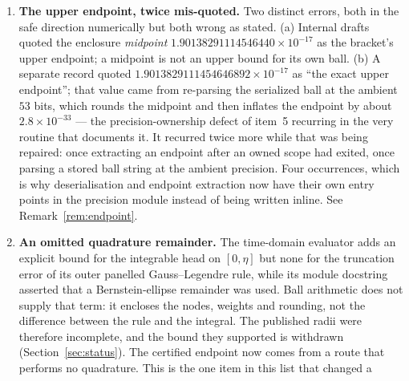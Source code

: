 \documentclass[11pt,a4paper]{article}
\theoremstyle{definition}
\theoremstyle{remark}
\begin{document}
\begin{enumerate}
  changed its caller's context; this produced four separate wrong constants in
  this project, each plausible-looking rather than an error (a complement
  constant at $[\pm 7.4\times10^{132}]$, an even-sector $d$ at $[\pm
  2.8\times10^{183}]$, and two coefficient sets built at $53$ bits). The repair
  is an owned-scope wrapper that asserts restoration on normal return
  \emph{and} on exception, caches keyed by precision so a low-precision value
  can never be served to a high-precision caller, and an explicit
  \emph{unresolved} result for any wide or non-finite enclosure. The lesson, and
  the harder half, is that \emph{an input constructed outside the scope carries
  the ambient precision's radius, and entering a higher-precision scope
  afterwards does not recover it}: own your inputs as well as your scope.
\item \textbf{The upper endpoint, twice mis-quoted.} Two distinct errors, both
  in the safe direction numerically but both wrong as stated. (a) Internal
  drafts quoted the enclosure \emph{midpoint}
  $1.90138291114546440\times10^{-17}$ as the bracket's upper endpoint; a
  midpoint is not an upper bound for its own ball. (b) A separate record quoted
  $1.9013829111454646892\times10^{-17}$ as ``the exact upper endpoint''; that
  value came from re-parsing the serialized ball at the ambient $53$ bits,
  which rounds the midpoint and then inflates the endpoint by about
  $2.8\times10^{-33}$ --- the precision-ownership defect of item~5 recurring in
  the very routine that documents it. It recurred twice more while that was
  being repaired: once extracting an endpoint after an owned scope had exited,
  once parsing a stored ball string at the ambient precision. Four occurrences,
  which is why deserialisation and endpoint extraction now have their own entry
  points in the precision module instead of being written inline.
  See Remark~\ref{rem:endpoint}.
\item \textbf{An omitted quadrature remainder.} The time-domain evaluator adds
  an explicit bound for the integrable head on $[0,\eta]$ but none for the
  truncation error of its outer panelled Gauss--Legendre rule, while its module
  docstring asserted that a Bernstein-ellipse remainder was used. Ball
  arithmetic does not supply that term: it encloses the nodes, weights and
  rounding, not the difference between the rule and the integral. The published
  radii were therefore incomplete, and the bound they supported is withdrawn
  (Section~\ref{sec:status}). The certified endpoint now comes from a route that
  performs no quadrature. This is the one item in this list that changed a

\end{enumerate}
\end{document}
